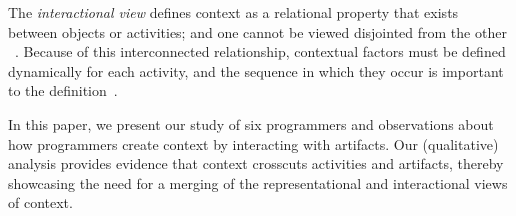 The \textit{interactional view} defines context as a relational property that exists between objects or activities; and one cannot be viewed disjointed from the other ~\cite{Dourish:2004}. Because of this interconnected relationship, contextual factors must be defined dynamically for each activity, and the sequence in which they occur is important to the definition~\cite{Viriyakattiyaporn:2010}.

In this paper, we present our study of six programmers and observations about how programmers create context by interacting with artifacts. Our (qualitative) analysis provides evidence that context crosscuts activities and artifacts, thereby showcasing the need for a merging of the representational and interactional views of context.



